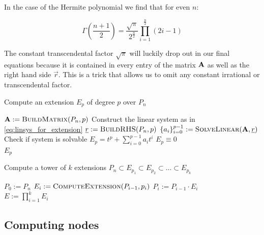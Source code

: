 \documentclass[a4paper,10pt]{article}
\begin{document}
In the case of the Hermite polynomial we find that for even $n$:

\begin{equation}
  \Gamma\left(\frac{n + 1}{2}\right) =
  \frac{\sqrt{\pi}}{2^{\frac{n}{2}}} \prod_{i=1}^{\frac{n}{2}} (2 i - 1)
\end{equation}

The constant transcendental factor $\sqrt{\pi}$ will luckily drop out in our final equations
because it is contained in every entry of the matrix $\mat{A}$ as well as the right hand
side $\vec{r}$. This is a trick that allows us to omit any constant irrational or transcendental
factor.

\begin{algorithm}
  \caption{Compute an extension $E_p$ of degree $p$ over $P_n$}
  \label{alg:find_extension}
  \begin{algorithmic}
    \State $\mat{A} := \textsc{BuildMatrix}(P_n, p)$
    \Comment Construct the linear system as in \eqref{eq:linsys_for_extension}
    \State $\vec{r} := \textsc{BuildRHS}(P_n, p)$
    \State $\{a_i\}_{i=0}^{p-1} := \textsc{SolveLinear}(\mat{A}, \vec{r})$
    \Comment Check if system is solvable
      \State $E_p = t^p + \sum_{i=0}^{p-1} a_i t^i$
    \Else
      \State $E_p \equiv 0$
    \EndIf \\
    \Return $E_p$
    \EndProcedure
  \end{algorithmic}
\end{algorithm}

\begin{algorithm}
  \caption{Compute a tower of $k$ extensions
           $P_n \subset E_{p_1} \subset E_{p_2} \subset \ldots \subset E_{p_k}$ }
  \label{alg:find_multiextension}
  \begin{algorithmic}
    \State $P_0 := P_n$
      \State $E_i := \textsc{ComputeExtension}(P_{i-1}, p_i)$
      \State $P_i := P_{i-1} \cdot E_i$
    \EndFor \\
    \Return $E := \prod_{i=1}^k E_i$
    \EndProcedure
  \end{algorithmic}
\end{algorithm}


\subsection{Computing nodes}
\end{document}

